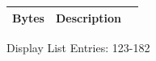 \begin{minipage}[b]{0.31\linewidth}
  \begin{figure}[H]
    {
      \setlength{\tabcolsep}{3.0pt}
      \setlength\cmidrulewidth{\heavyrulewidth} %
      \begin{adjustbox}{height=8.5cm}

        \begin{tabular}{lll}
          \toprule
          Bytes       & Description                                                         \\
          \midrule
        \end{tabular}

      \end{adjustbox}

    }\caption*{Display List Entries: 123-182}
  \end{figure}
\end{minipage}

